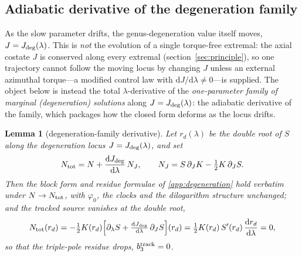 \documentclass[12pt]{iopart}
\newcommand{\Jc}{J_{\rm deg}}
\newcommand{\dd}{\mathrm{d}}
\theoremstyle{plain}
\newtheorem{lemma}[theorem]{Lemma}
\theoremstyle{definition}
\theoremstyle{plain}
\theoremstyle{remark}
\newcommand{\Ithm}[1]{\setcounter{theorem}{\numexpr#1-1\relax}}
\begin{document}
\subsection{Adiabatic derivative of the degeneration family}
\label{app:tracking}
As the slow parameter drifts, the genus-degeneration value itself moves,
$J=\Jc(\lambda)$. This is \emph{not} the evolution of a single torque-free extremal:
the axial costate $J$ is conserved along every extremal
(section~\ref{sec:principle}), so one trajectory cannot follow the moving locus by
changing $J$ unless an external azimuthal torque---a modified control law with
$\dd J/\dd\lambda\neq0$---is supplied. The object below is instead the total
$\lambda$-derivative of the \emph{one-parameter family of marginal (degeneration)
solutions} along $J=\Jc(\lambda)$: the adiabatic derivative of the family, which
packages how the closed form deforms as the locus drifts.

\Ithm{6}
\begin{lemma}[degeneration-family derivative]\label{lem:tracking}
Let $r_d(\lambda)$ be the double root of $S$ along the degeneration locus
$J=\Jc(\lambda)$, and set
\begin{equation}
N_{\rm tot}=N+\frac{\dd\Jc}{\dd\lambda}\,N_J,\qquad
N_J=S\,\partial_JK-\tfrac12K\,\partial_JS.
\label{eq:Ntot-track}
\end{equation}
Then the block form and residue formulae of \ref{app:degeneration} hold verbatim under
$N\to N_{\rm tot}$, with $\varphi_0$, the clocks and the dilogarithm structure unchanged;
and the tracked source vanishes at the double root,
\begin{equation}
N_{\rm tot}(r_d)=-\tfrac12K(r_d)\Big[\partial_\lambda S
+\tfrac{\dd\Jc}{\dd\lambda}\,\partial_JS\Big](r_d)
=\tfrac12K(r_d)\,S'(r_d)\,\frac{\dd r_d}{\dd\lambda}=0,
\label{eq:track-cancel}
\end{equation}
so that the triple-pole residue drops, $b_3^{\rm track}=0$.
\end{lemma}
\end{document}
